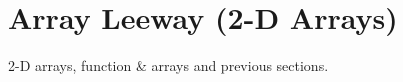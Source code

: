 \section{Array Leeway (2-D Arrays)}
\begin{topics}
2-D arrays, function \& arrays and previous sections.
\end{topics}



